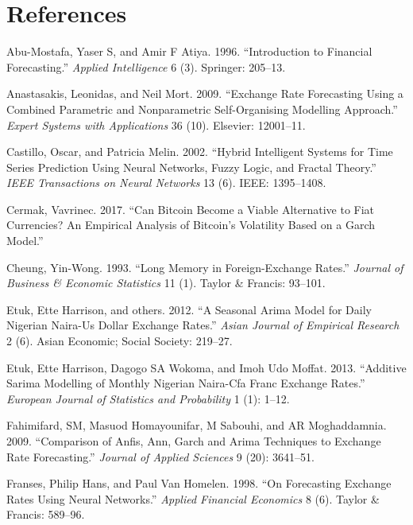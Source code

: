 \documentclass[12pt,preprint, authoryear]{elsarticle}
\numberwithin{equation}{section}
\numberwithin{figure}{section}
\numberwithin{table}{section}
\begin{document}
\newpage

\section*{References}\label{references}

\hypertarget{refs}{}
\hypertarget{ref-abu1996}{}
Abu-Mostafa, Yaser S, and Amir F Atiya. 1996. ``Introduction to
Financial Forecasting.'' \emph{Applied Intelligence} 6 (3). Springer:
205--13.

\hypertarget{ref-anastasakis2009}{}
Anastasakis, Leonidas, and Neil Mort. 2009. ``Exchange Rate Forecasting
Using a Combined Parametric and Nonparametric Self-Organising Modelling
Approach.'' \emph{Expert Systems with Applications} 36 (10). Elsevier:
12001--11.

\hypertarget{ref-castillo2002}{}
Castillo, Oscar, and Patricia Melin. 2002. ``Hybrid Intelligent Systems
for Time Series Prediction Using Neural Networks, Fuzzy Logic, and
Fractal Theory.'' \emph{IEEE Transactions on Neural Networks} 13 (6).
IEEE: 1395--1408.

\hypertarget{ref-cermak2017}{}
Cermak, Vavrinec. 2017. ``Can Bitcoin Become a Viable Alternative to
Fiat Currencies? An Empirical Analysis of Bitcoin's Volatility Based on
a Garch Model.''

\hypertarget{ref-cheung1993}{}
Cheung, Yin-Wong. 1993. ``Long Memory in Foreign-Exchange Rates.''
\emph{Journal of Business \& Economic Statistics} 11 (1). Taylor \&
Francis: 93--101.

\hypertarget{ref-etuk2012}{}
Etuk, Ette Harrison, and others. 2012. ``A Seasonal Arima Model for
Daily Nigerian Naira-Us Dollar Exchange Rates.'' \emph{Asian Journal of
Empirical Research} 2 (6). Asian Economic; Social Society: 219--27.

\hypertarget{ref-etuk2013}{}
Etuk, Ette Harrison, Dagogo SA Wokoma, and Imoh Udo Moffat. 2013.
``Additive Sarima Modelling of Monthly Nigerian Naira-Cfa Franc Exchange
Rates.'' \emph{European Journal of Statistics and Probability} 1 (1):
1--12.

\hypertarget{ref-fahimifard2009}{}
Fahimifard, SM, Masuod Homayounifar, M Sabouhi, and AR Moghaddamnia.
2009. ``Comparison of Anfis, Ann, Garch and Arima Techniques to Exchange
Rate Forecasting.'' \emph{Journal of Applied Sciences} 9 (20): 3641--51.

\hypertarget{ref-franses1998}{}
Franses, Philip Hans, and Paul Van Homelen. 1998. ``On Forecasting
Exchange Rates Using Neural Networks.'' \emph{Applied Financial
Economics} 8 (6). Taylor \& Francis: 589--96.
\end{document}
